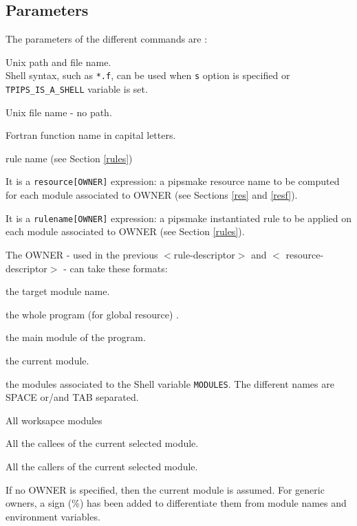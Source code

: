 \documentclass[a4paper,12pt]{article}
\begin{document}
\subsection{Parameters}
The parameters of the different commands are :
\begin{description}
\quote
\item [$<$file-name$>$] Unix path and file name. \\ Shell syntax, such
  as \verb+*.f+, can be used when \verb+s+ option is specified or \verb+TPIPS_IS_A_SHELL+ variable is set.
          
\item [$<$workspace-name$>$] Unix file name - no path.
  
\item [$<$module-name$>$] Fortran function name in capital letters.
  
\item [$<$rule-name$>$] rule name (see Section \ref{rules})
          
\item [$<$resource-descriptor$>$] It is a \verb+resource[OWNER]+
  expression: a pipsmake resource name to be computed for each module
  associated to OWNER (see Sections \ref{res} and \ref{resf}).
  
\item [$<$rule-descriptor$>$] It is a \verb+rulename[OWNER]+ expression: a  pipsmake instantiated
  rule  to be applied  on each  module associated to OWNER (see Section \ref{rules}).


\end{description}

The OWNER - used in the previous $<$rule-descriptor$>$ and
$<$ resource-descriptor$>$ - can take these formats:

\begin{description}
\quote
        \item [module-name] the target module name.
        \item [\%PROGRAM] the whole program (for global resource) . 
        \item [\%MAIN] the main module of the program. 
        \item [\%MODULE] the current  module.
        \item [\$\{MODULES\}] the modules associated to the Shell variable
          {\tt MODULES}. The different names are SPACE or/and TAB separated.
        \item [\%ALL] All worksapce modules 
        \item [\%CALLEES] All the callees of the current selected  module.
        \item [\%CALLERS]  All  the callers of the current selected  module.

\end{description}
If no OWNER is specified, then the current  module is assumed. For
generic owners, a  sign (\%) has been added to differentiate them
from module names and environment variables.
\end{document}
